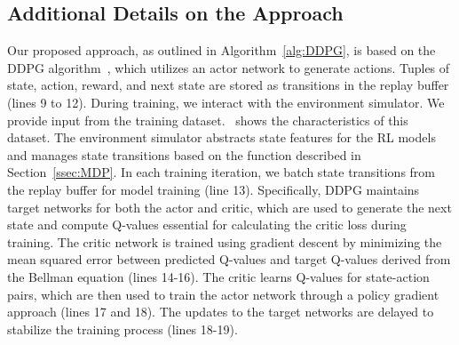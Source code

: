 \subsection{Additional Details on the Approach}
\label{ss:appendix_approach}

Our proposed approach, as outlined in Algorithm~\ref{alg:DDPG}, is based on the DDPG algorithm~\cite{lillicrap2015continuous}, 
which utilizes an actor network to generate actions. Tuples of state, action, reward, and next state are stored as transitions in the replay buffer (lines 9 to 12). 
%
During training, we interact with the environment simulator. We provide input from the training dataset.~ shows the characteristics of this dataset. The environment simulator abstracts state features for the RL models and manages state transitions based on the function described in Section~\ref{ssec:MDP}. 
%
In each training iteration, we batch state transitions from the replay buffer for model training (line 13). Specifically, DDPG maintains target networks for both the actor and critic, which are used to generate the next state and compute Q-values essential for calculating the critic loss during training. The critic network is trained using gradient descent by minimizing the mean squared error between predicted Q-values and target Q-values derived from the Bellman equation (lines 14-16). The critic learns Q-values for state-action pairs, which are then used to train the actor network through a policy gradient approach (lines 17 and 18). The updates to the target networks are delayed to stabilize the training process (lines 18-19). 

